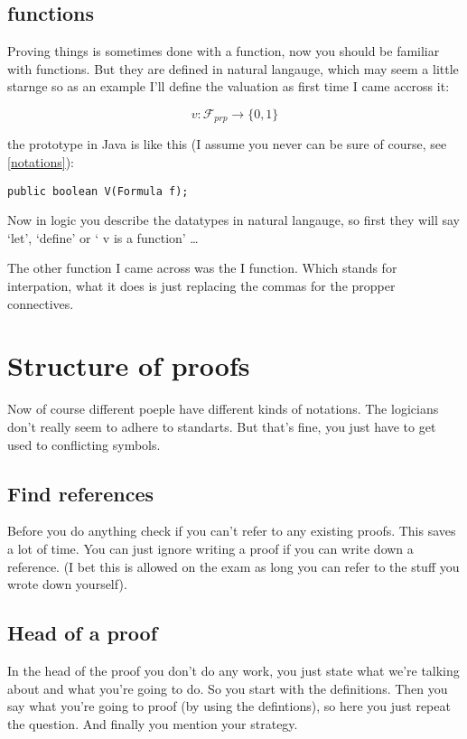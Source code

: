 \documentclass{article}
\begin{document}
\subsection{functions}
Proving things is sometimes done with a function,
now you should be familiar with functions.
But they are defined in natural langauge, which may seem a little starnge
so as an example I'll define the valuation as first time I came accross it:

\[v:\mathcal{F}_{prp} \to \{0,1\}\]

the prototype in Java is like this (I assume you never can be sure of course,
see \autoref{notations}):


\begin{lstlisting}[frame=single] 
	public boolean V(Formula f);
\end{lstlisting}

Now in logic you describe the datatypes in natural langauge, so first they will
say `let', `define' or ` v is a function' \ldots

The other function I came across was the I function. Which stands for 
interpation, what it does is just replacing the commas for the propper
connectives.

\section{Structure of proofs}
\label{structure of proofs}
Now of course different poeple have different kinds of notations. The logicians
don't really seem to adhere to standarts. But that's fine, you just have to
get used to conflicting symbols.

\subsection{Find references}
Before you do anything check if you can't refer to any existing proofs.
This saves a lot of time. You can just ignore writing a proof if you can
write down a reference. (I bet this is allowed on the exam as long you
can refer to the stuff you wrote down yourself).

\subsection{Head of a proof}
In the head of the proof you don't do any work, you just state what we're
talking about and what you're going to do. So you start with the definitions.
Then you say what you're going to proof (by using the defintions), so here
you just repeat the question. And finally you mention your strategy.
\end{document}
